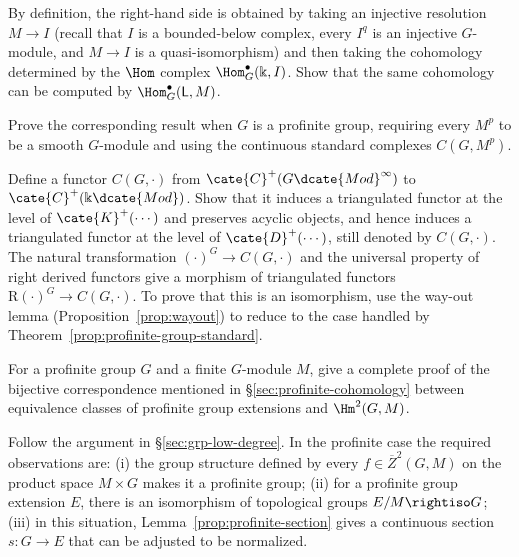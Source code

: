 \begin{Exercises}
	\begin{hint}
		By definition, the right-hand side is obtained by taking an injective
		resolution $M\to I$ (recall that $I$ is a bounded-below complex, every
		$I^q$ is an injective $G$-module, and $M\to I$ is a quasi-isomorphism)
		and then taking the cohomology determined by the $\Hom$ complex
		$\Hom^\bullet_G(\Bbbk,I)$. Show that the same cohomology can be
		computed by $\Hom^\bullet_G(\mathsf{L},M)$.
	\end{hint}

	\item Prove the corresponding result when $G$ is a profinite group,
	requiring every $M^p$ to be a smooth $G$-module and using the continuous
	standard complexes $C(G,M^p)$.

	\begin{hint}
		Define a functor $C(G,\cdot)$ from
		$\cate{C}^+(G\dcate{Mod}^\infty)$ to
		$\cate{C}^+(\Bbbk\dcate{Mod})$. Show that it induces a triangulated
		functor at the level of $\cate{K}^+(\cdots)$ and preserves acyclic
		objects, and hence induces a triangulated functor at the level of
		$\cate{D}^+(\cdots)$, still denoted by $C(G,\cdot)$. The natural
		transformation $(\cdot)^G\to C(G,\cdot)$ and the universal property of
		right derived functors give a morphism of triangulated functors
		$\mathrm{R}(\cdot)^G\to C(G,\cdot)$. To prove that this is an
		isomorphism, use the way-out lemma (Proposition~\ref{prop:wayout}) to
		reduce to the case handled by
		Theorem~\ref{prop:profinite-group-standard}.
	\end{hint}

	\item For a profinite group $G$ and a finite $G$-module $M$, give a
	complete proof of the bijective correspondence mentioned in
	\S\ref{sec:profinite-cohomology} between equivalence classes of
	profinite group extensions and $\Hm^2(G,M)$.

	\begin{hint}
		Follow the argument in \S\ref{sec:grp-low-degree}. In the profinite
		case the required observations are: (i) the group structure defined by
		every $f\in\overline{Z}^2(G,M)$ on the product space $M\times G$ makes
		it a profinite group; (ii) for a profinite group extension $E$, there
		is an isomorphism of topological groups $E/M\rightiso G$; (iii) in
		this situation, Lemma~\ref{prop:profinite-section} gives a continuous
		section $s:G\to E$ that can be adjusted to be
		normalized.
	\end{hint}


\end{Exercises}
